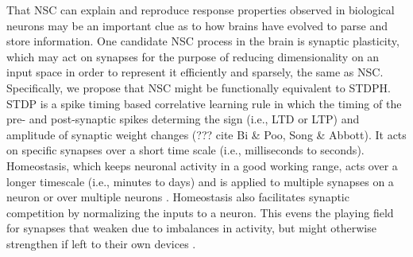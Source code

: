 %

That \ac{NSC} can explain and reproduce response properties observed in biological neurons may be an important clue as to how brains have evolved to parse and store information. One candidate NSC process in the brain is synaptic plasticity, which may act on synapses for the purpose of reducing dimensionality on an input space in order to represent it efficiently and sparsely, the same as \ac{NSC}. Specifically, we
propose that \ac{NSC} might be functionally equivalent to \ac{STDPH}. STDP is a spike timing based correlative learning rule in which the
timing of the pre- and post-synaptic spikes determing the sign (i.e., LTD or LTP) and amplitude of synaptic weight changes (??? cite Bi \& Poo, Song \& Abbott). 
It acts on specific synapses over a short time scale 
(i.e., milliseconds to seconds). Homeostasis, which keeps neuronal activity in a good working range, acts over a longer timescale (i.e., minutes to days) and is applied to multiple synapses on a neuron or over multiple neurons \citep{turrigiano1998}.  Homeostasis also facilitates synaptic competition by normalizing the inputs to a neuron. This evens the playing field for synapses that weaken due to imbalances in activity, but might otherwise strengthen if left to their own devices \citep{chistiakova2015}.

